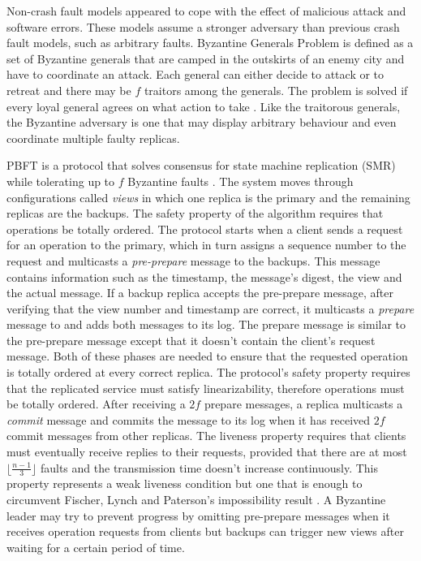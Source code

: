 \documentclass[runningheads,a4paper]{llncs}
\begin{document}
Non-crash fault models appeared to cope with the effect of malicious attack and software errors. These models assume a stronger adversary than previous crash fault models, such as arbitrary faults. Byzantine Generals Problem is defined as a set of Byzantine generals that are camped in the outskirts of an enemy city and have to coordinate an attack. Each general can either decide to attack or to retreat and there may be $f$ traitors among the generals. The problem is solved if every loyal general agrees on what action to take \cite{Lamport1982}. Like the traitorous generals, the Byzantine adversary is one that may display arbitrary behaviour and even coordinate multiple faulty replicas. \par
{}
PBFT is a protocol that solves consensus for state machine replication (SMR) while tolerating up to $f$ Byzantine faults \cite{Castro1999}. The system moves through configurations called \textit{views} in which one replica is the primary and the remaining replicas are the backups. The safety property of the algorithm requires that operations be totally ordered. The protocol starts when a client sends a request for an operation to the primary, which in turn assigns a sequence number to the request and multicasts a \textit{pre-prepare} message to the backups. This message contains information such as the timestamp, the message's digest, the view and the actual message. If a backup replica accepts the pre-prepare message, after verifying that the view number and timestamp are correct, it multicasts a \textit{prepare} message to and adds both messages to its log. The prepare message is similar to the pre-prepare message except that it doesn't contain the client's request message. Both of these phases are needed to ensure that the requested operation is totally ordered at every correct replica. The protocol's safety property requires that the replicated service must satisfy linearizability, therefore operations must be totally ordered. After receiving a $2f$ prepare messages, a replica multicasts a \textit{commit} message and commits the message to its log when it has received $2f$ commit messages from other replicas. The liveness property requires that clients must eventually receive replies to their requests, provided that there are at most $\lfloor\frac{n-1}{3}\rfloor$ faults and the transmission time doesn't increase continuously. This property represents a weak liveness condition but one that is enough to circumvent Fischer, Lynch and Paterson's impossibility result \cite{Fischer1985}. A Byzantine leader may try to prevent progress by omitting pre-prepare messages when it receives operation requests from clients but backups can trigger new views after waiting for a certain period of time. \par
\end{document}
